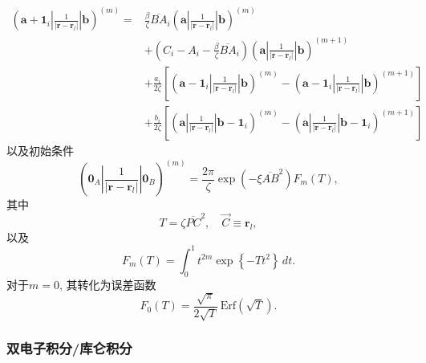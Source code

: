 \documentclass[12pt,a4paper,openany,twoside]{article}
\numberwithin{equation}{section}
\begin{document}
                \begin{equation}
                    \begin{aligned}
                    (\boldsymbol{a} + \boldsymbol{1}_i|\frac{1}{|\boldsymbol{r}-\boldsymbol{r}_l|}|\boldsymbol{b})^{(m)} =  & \frac{\beta}{\zeta} \overline{BA}_i (\boldsymbol{a}|\frac{1}{|\boldsymbol{r}-\boldsymbol{r}_l|}|\boldsymbol{b})^{(m)} \\
                    & + \left(C_i - A_i - \frac{\beta}{\zeta} \overline{BA}_i \right) (\boldsymbol{a}|\frac{1}{|\boldsymbol{r}-\boldsymbol{r}_l|}|\boldsymbol{b})^{(m+1)} \\
                    & + \frac{a_i}{2\zeta}\left[(\boldsymbol{a} - \boldsymbol{1}_i|\frac{1}{|\boldsymbol{r}-\boldsymbol{r}_l|}|\boldsymbol{b})^{(m)}- (\boldsymbol{a} - \boldsymbol{1}_i|\frac{1}{|\boldsymbol{r}-\boldsymbol{r}_l|}|\boldsymbol{b})^{(m+1)}\right] \\
                    & + \frac{b_i}{2\zeta}\left[(\boldsymbol{a}|\frac{1}{|\boldsymbol{r}-\boldsymbol{r}_l|}|\boldsymbol{b}- \boldsymbol{1}_i)^{(m)}- (\boldsymbol{a}|\frac{1}{|\boldsymbol{r}-\boldsymbol{r}_l|}|\boldsymbol{b} - \boldsymbol{1}_i)^{(m+1)}\right]
                    \end{aligned}
                \end{equation}
                以及初始条件
                \begin{equation}
                    (\boldsymbol{0}_A|\frac{1}{|\boldsymbol{r}-\boldsymbol{r}_l|}|\boldsymbol{0}_B)^{(m)} = \frac{2\pi}{\zeta} \exp\left(- \xi \overline{AB}^2\right) F_m(T),
                \end{equation}
                其中
                \begin{equation}
                    T = \zeta \overline{PC}^2, \quad \vec{C} \equiv \boldsymbol{r}_l
                ,\end{equation}
                以及
                \begin{equation}
                    F_m (T) = \int ^1_0 t^{2m} \exp \left\{ - T t^2 \right\}  \, dt 
                .\end{equation}
                对于$m=0$,  其转化为误差函数
                \begin{equation}
                    F_0(T) = \frac{\sqrt{\pi}}{2\sqrt{T}} \,\mathrm{Erf}\left(\sqrt{T}\right).
                \end{equation}


                \subsubsection{双电子积分/库仑积分}
            
\end{document}
